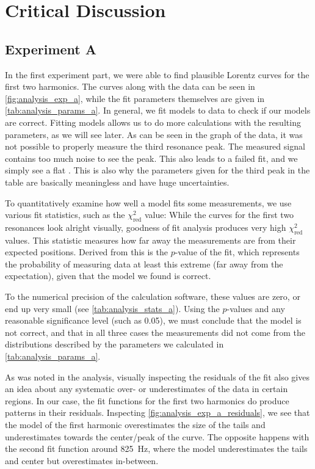 \section{Critical Discussion}


\subsection{Experiment A}

In the first experiment part, we were able to find plausible Lorentz curves for the first two harmonics.
The curves along with the data can be seen in \autoref{fig:analysis_exp_a}, while the fit parameters themselves are given in \autoref{tab:analysis_params_a}.
In general, we fit models to data to check if our models are correct.
Fitting models allows us to do more calculations with the resulting parameters, as we will see later.
As can be seen in the graph of the data, it was not possible to properly measure the third resonance peak.
The measured signal contains too much noise to see the peak.
This also leads to a failed fit, and we simply see a flat .
This is also why the parameters given for the third peak in the table are basically meaningless and have huge uncertainties.

To quantitatively examine how well a model fits some measurements, we use various fit statistics, such as the $\chi^2_\mathrm{red}$ value:
While the curves for the first two resonances look alright visually, goodness of fit analysis produces very high $\chi^2_\mathrm{red}$ values.
This statistic measures how far away the measurements are from their expected positions.
Derived from this is the $p$-value of the fit, which represents the probability of measuring data at least this extreme (far away from the expectation), given that the model we found is correct.

To the numerical precision of the calculation software, these values are zero, or end up very small (see \autoref{tab:analysis_stats_a}).
Using the $p$-values and any reasonable significance level (such as \num{0.05}), we must conclude that the model is not correct, and that in all three cases the measurements did not come from the distributions described by the parameters we calculated in \autoref{tab:analysis_params_a}.

As was noted in the analysis, visually inspecting the residuals of the fit also gives an idea about any systematic over- or underestimates of the data in certain regions.
In our case, the fit functions for the first two harmonics do produce patterns in their residuals.
Inspecting \autoref{fig:analysis_exp_a_residuals}, we see that the model of the first harmonic overestimates the size of the tails and underestimates towards the center/peak of the curve.
The opposite happens with the second fit function around \qty{825}{\hertz}, where the model underestimates the tails and center but overestimates in-between.

